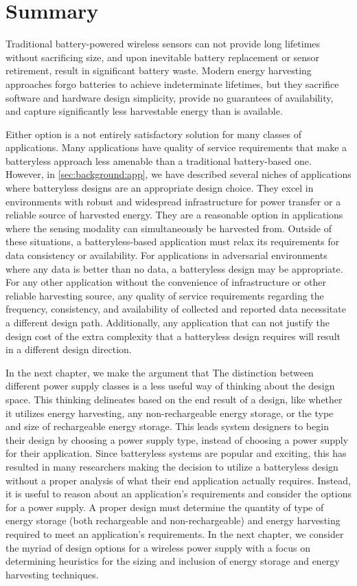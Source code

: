 \section{Summary}
Traditional battery-powered wireless sensors can not provide long lifetimes without sacrificing size, and upon inevitable battery replacement or sensor retirement, result in significant battery waste.
Modern energy harvesting approaches forgo batteries to achieve indeterminate lifetimes, but they sacrifice software and hardware design simplicity, provide no guarantees of availability, and capture significantly less harvestable energy than is available.

Either option is a not entirely satisfactory solution for many classes of applications.
Many applications have quality of service requirements that make a batteryless approach less amenable than a traditional battery-based one.
However, in \cref{sec:background:app}, we have described several niches of applications where batteryless designs are an appropriate design choice.
They excel in environments with robust and widespread infrastructure for power transfer or a reliable source of harvested energy. They are a reasonable option in applications where the sensing modality can simultaneously be harvested from.
Outside of these situations, a batteryless-based application must relax its requirements for data consistency or availability. For applications in adversarial environments where any data is better than no data, a batteryless design may be appropriate. 
For any other application without the convenience of infrastructure or other reliable harvesting source, any quality of service requirements regarding the frequency, consistency, and availability of collected and reported data necessitate a different design path.
Additionally, any application that can not justify the design cost of the extra complexity that a batteryless design requires will result in a different design direction. 

In the next chapter, we make the argument that 
The distinction between different power supply classes is a less useful way of thinking about the design space.
This thinking delineates based on the end result of a design, like whether it utilizes energy harvesting, any non-rechargeable energy storage, or the type and size of rechargeable energy storage.
This leads system designers to begin their design by choosing a power supply type, instead of choosing a power supply for their application.
Since batteryless systems are popular and exciting, this has resulted in many researchers making the decision to utilize a batteryless design without a proper analysis of what their end application actually requires.
Instead, it is useful to reason about an application's requirements and consider the options for a power supply. A proper design must determine the quantity of type of energy storage (both rechargeable and non-rechargeable) and energy harvesting required to meet an application's requirements.
In the next chapter, we consider the myriad of design options for a wireless power supply with a focus on determining heuristics for the sizing and inclusion of energy storage and energy harvesting techniques.

